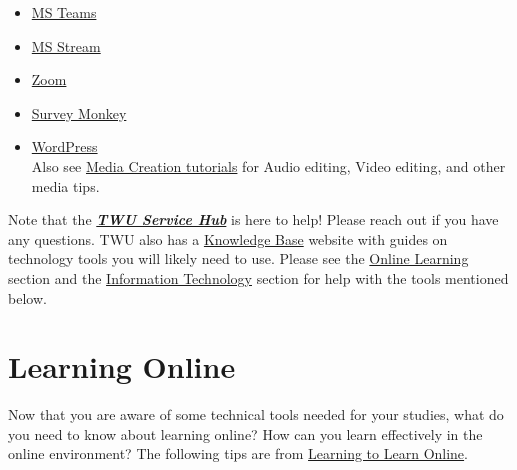 \documentclass[
]{book}
\providecommand{\tightlist}{%
  \setlength{\itemsep}{0pt}\setlength{\parskip}{0pt}}
\theoremstyle{definition}
\theoremstyle{definition}
\theoremstyle{definition}
\theoremstyle{definition}
\theoremstyle{remark}
\begin{document}
\begin{itemize}
\tightlist
\item
  \href{https://trinitywestern.teamdynamix.com/TDClient/1904/Portal/KB/?CategoryID=17821\&SIDs=11353}{MS Teams}\\
\item
  \href{https://trinitywestern.teamdynamix.com/TDClient/1904/Portal/KB/?CategoryID=23454}{MS Stream}\\
\item
  \href{https://trinitywestern.teamdynamix.com/TDClient/1904/Portal/KB/?CategoryID=17478}{Zoom}\\
\item
  \href{https://trinitywestern.teamdynamix.com/TDClient/1904/Portal/KB/ArticleDet?ID=47076}{Survey Monkey}\\
\item
  \href{https://trinitywestern.teamdynamix.com/TDClient/1904/Portal/KB/?CategoryID=4746}{WordPress}\\
  Also see \href{https://trinitywestern.teamdynamix.com/TDClient/1904/Portal/KB/?CategoryID=6940}{Media Creation tutorials} for Audio editing, Video editing, and other media tips.
\end{itemize}

\begin{feedback}
Note that the
\href{https://trinitywestern.teamdynamix.com/TDClient/1904/Portal/KB/ArticleDet?ID=16267}{\textbf{\emph{TWU
Service Hub}}} is here to help! Please reach out if you have any
questions. TWU also has a
\href{https://trinitywestern.teamdynamix.com/TDClient/1904/Portal/KB/}{Knowledge
Base} website with guides on technology tools you will likely need to
use. Please see the
\href{https://trinitywestern.teamdynamix.com/TDClient/1904/Portal/KB/?CategoryID=4747}{Online
Learning} section and the
\href{https://trinitywestern.teamdynamix.com/TDClient/1904/Portal/KB/?CategoryID=21800}{Information
Technology} section for help with the tools mentioned below.
\end{feedback}

\hypertarget{learning-online}{%
\section{Learning Online}\label{learning-online}}

Now that you are aware of some technical tools needed for your studies, what do you need to know about learning online? How can you learn effectively in the online environment? The following tips are from \href{https://pressbooks.bccampus.ca/learningtolearnonlinereview/chapter/learning-skills/}{Learning to Learn Online}.
\end{document}
